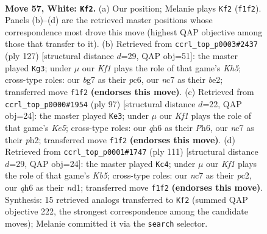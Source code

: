 \documentclass[11pt]{article}
\begin{document}
\clearpage

\begin{figure}[p]\centering
\begin{subfigure}{0.46\textwidth}\centering
\resizebox{\linewidth}{!}{%
\newchessgame
\chessboard[
  setfen={6k1/2n2pb1/7q/3P4/8/8/6R1/5K2 w - - 0 57},
  showmover=false,
  pgfstyle=straightmove, color=movearrow, markmove={f1-f2}
]}
\caption{}
\end{subfigure}\hfill
\begin{subfigure}{0.46\textwidth}\centering
\resizebox{\linewidth}{!}{%
\newchessgame
\chessboard[
  setfen={2r5/8/2P5/2K5/6pk/4p3/4B3/2N5 b - - 3 64},
  showmover=false,
  pgfstyle=straightmove, color=movearrow, markmove={h4-g3}
]}
\caption{}
\end{subfigure}
\\[4pt]
\begin{subfigure}{0.46\textwidth}\centering
\resizebox{\linewidth}{!}{%
\newchessgame
\chessboard[
  setfen={8/8/3N3p/8/4kp2/8/6PP/r3BK2 b - - 2 49},
  showmover=false,
  pgfstyle=straightmove, color=movearrow, markmove={e4-e3}
]}
\caption{}
\end{subfigure}\hfill
\begin{subfigure}{0.46\textwidth}\centering
\resizebox{\linewidth}{!}{%
\newchessgame
\chessboard[
  setfen={8/8/8/2p5/1k6/8/2P1KB1r/3N4 b - - 6 56},
  showmover=false,
  pgfstyle=straightmove, color=movearrow, markmove={b4-c4}
]}
\caption{}
\end{subfigure}
\caption{\textbf{Move 57, White: \texttt{Kf2}.} (a) Our position; Melanie plays \texttt{Kf2} (\texttt{f1f2}). Panels (b)--(d) are the retrieved master positions whose correspondence most drove this move (highest QAP objective among those that transfer to it). (b) Retrieved from \texttt{ccrl\_top\_p0003\#2437} (ply 127) [structural distance $d$=29, QAP obj=51]: the master played \texttt{Kg3}; under $\mu$ our \emph{Kf1} plays the role of that game's \emph{Kh5}; cross-type roles: our \emph{b}g7 as their \emph{p}c6, our \emph{n}c7 as their \emph{b}e2; transferred move \texttt{f1f2} \textbf{(endorses this move)}. (c) Retrieved from \texttt{ccrl\_top\_p0000\#1954} (ply 97) [structural distance $d$=22, QAP obj=24]: the master played \texttt{Ke3}; under $\mu$ our \emph{Kf1} plays the role of that game's \emph{Ke5}; cross-type roles: our \emph{q}h6 as their \emph{P}h6, our \emph{n}c7 as their \emph{p}h2; transferred move \texttt{f1f2} \textbf{(endorses this move)}. (d) Retrieved from \texttt{ccrl\_top\_p0001\#1747} (ply 111) [structural distance $d$=29, QAP obj=24]: the master played \texttt{Kc4}; under $\mu$ our \emph{Kf1} plays the role of that game's \emph{Kb5}; cross-type roles: our \emph{n}c7 as their \emph{p}c2, our \emph{q}h6 as their \emph{n}d1; transferred move \texttt{f1f2} \textbf{(endorses this move)}. Synthesis: 15 retrieved analogs transferred to \texttt{Kf2} (summed QAP objective 222, the strongest correspondence among the candidate moves); Melanie committed it via the \texttt{search} selector.}
\label{fig:thought-m112}
\end{figure}
\end{document}
